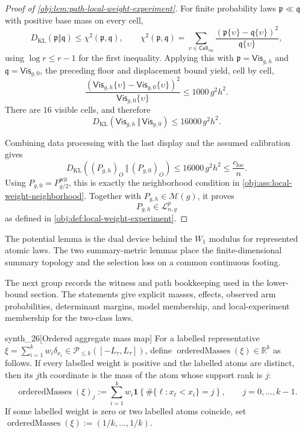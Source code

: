 \documentclass[11pt]{article}
\begin{document}
\begin{proof}[Proof of \cref{obj:lem:path-local-weight-experiment}]
For finite probability laws \(\mathfrak p\ll\mathfrak q\) with positive base mass on every cell,
\[
D_{\mathrm{KL}}(\mathfrak p\Vert\mathfrak q)
\le
\chi^2(\mathfrak p,\mathfrak q),
\qquad
\chi^2(\mathfrak p,\mathfrak q)
=
\sum_{\upsilon\in\mathsf{Cell}_{\mathrm{vis}}}
\frac{(\mathfrak p\{\upsilon\}-\mathfrak q\{\upsilon\})^2}{\mathfrak q\{\upsilon\}},
\]
using \(\log r\le r-1\) for the first inequality.  Applying this with \(\mathfrak p=\mathsf{Vis}_{g,h}\) and \(\mathfrak q=\mathsf{Vis}_{g,0}\), the preceding floor and displacement bound yield, cell by cell,
\[
\frac{
\left(\mathsf{Vis}_{g,h}\{\upsilon\}-\mathsf{Vis}_{g,0}\{\upsilon\}\right)^2
}{
\mathsf{Vis}_{g,0}\{\upsilon\}
}
\le
1000\,g^2h^2 .
\]
There are \(16\) visible cells, and therefore
\[
D_{\mathrm{KL}}\!\left(\mathsf{Vis}_{g,h}\,\Vert\,\mathsf{Vis}_{g,0}\right)
\le
16000\,g^2h^2 .
\] %

Combining data processing with the last display and the assumed calibration gives
\[
D_{\mathrm{KL}}\!\left((P_{g,h})_O\,\Vert\,(P_{g,0})_O\right)
\le
16000\,g^2h^2
\le
\frac{c_{\mathrm{loc}}}{n}.
\]
Using \(P_{g,0}=P^{\mathrm{wit}}_{g/2}\), this is exactly the neighborhood condition in \cref{obj:ass:local-weight-neighborhood}.  Together with \(P_{g,h}\in\mathcal M(g)\), it proves
\[
P_{g,h}\in\mathcal L_{n,g}^p
\]
as defined in \cref{obj:def:local-weight-experiment}. %
\end{proof}

The potential lemma is the dual device behind the \(W_1\) modulus for represented atomic laws. The two summary-metric lemmas place the finite-dimensional summary topology and the selection loss on a common continuous footing.

The next group records the witness and path bookkeeping used in the lower-bound section. The statements give explicit masses, effects, observed arm probabilities, determinant margins, model membership, and local-experiment membership for the two-class laws.

\begin{definitionv}{synth_26}[Ordered aggregate mass map]
For a labelled representative \(\xi=\sum_{i=1}^k w_i\delta_{x_i}\in\mathcal P_{\le k}([-L_\tau,L_\tau])\), define \(\operatorname{orderedMasses}(\xi)\in\mathbb R^k\) as follows. If every labelled weight is positive and the labelled atoms are distinct, then its \(j\)th coordinate is the mass of the atom whose support rank is \(j\):
\[
\operatorname{orderedMasses}(\xi)_j
:=\sum_{i=1}^k w_i\mathbf 1\!\left\{\#\{\ell:x_\ell<x_i\}=j\right\},
\qquad j=0,\ldots,k-1.
\]
If some labelled weight is zero or two labelled atoms coincide, set \(\operatorname{orderedMasses}(\xi):=(1/k,\ldots,1/k)\).
\end{definitionv}
\end{document}
